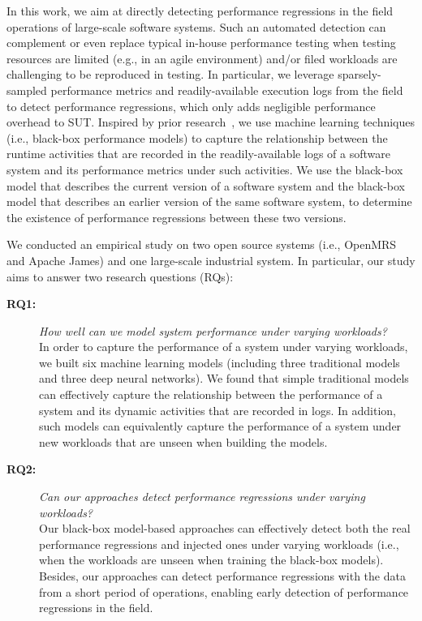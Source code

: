 In this work, we aim at directly detecting performance regressions in the field operations of large-scale software systems.
Such an automated detection can complement or even replace typical in-house performance testing when testing resources are limited (e.g., in an agile environment) and/or filed workloads are challenging to be reproduced in testing.
In particular, we leverage sparsely-sampled performance metrics and readily-available execution logs from the field to detect performance regressions, which only adds negligible performance overhead to SUT.
Inspired by prior research~\citep{Yao:2018:LSL:3184407.3184416,DBLP:conf/issre/FarshchiSWG15}, we use machine learning techniques (i.e., black-box performance models) to capture the relationship between the runtime activities that are recorded in the readily-available logs of a software system and its performance metrics under such activities. 
We use the black-box model that describes the current version of a software system and the black-box model that describes an earlier version of the same software system, to determine the existence of performance regressions between these two versions.

We conducted an empirical study on two open source systems (i.e., OpenMRS and Apache James) and one large-scale industrial system. 
In particular, our study aims to answer two research questions (RQs):

\begin{description}
\item[\textbf{RQ1:}] \textit{How well can we model system performance under varying workloads?} \\ 
In order to capture the performance of a system under varying workloads, we built six machine learning models (including three traditional models and three deep neural networks).
We found that simple traditional models can effectively capture the relationship between the performance of a system and its dynamic activities that are recorded in logs. 
In addition, such models can equivalently capture the performance of a system under new workloads that are unseen when building the models.

\item[\textbf{RQ2:}] \textit{Can our approaches detect performance regressions under varying workloads?} \\ 
Our black-box model-based approaches can effectively detect both the real performance regressions and injected ones under varying workloads (i.e., when the workloads are unseen when training the black-box models).
Besides, our approaches can detect performance regressions with the data from a short period of operations, enabling early detection of performance regressions in the field.

\end{description}

